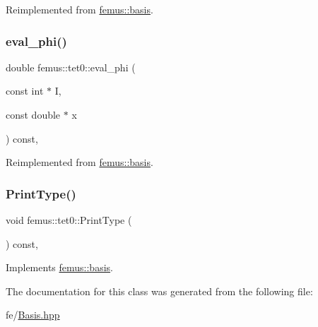 Reimplemented from \mbox{\hyperlink{classfemus_1_1basis_affd9927f6e25e264108219d862b8cb3d}{femus\+::basis}}.

\mbox{\label{classfemus_1_1tet0_a7d8d6040a264df9fe50440e9009f5ca4}} 
\subsubsection{\texorpdfstring{eval\+\_\+phi()}{eval\_phi()}}
{\footnotesize\ttfamily double femus\+::tet0\+::eval\+\_\+phi (\begin{DoxyParamCaption}\item[{const int $\ast$}]{I,  }\item[{const double $\ast$}]{x }\end{DoxyParamCaption}) const\hspace{0.3cm}{\ttfamily [inline]}, {\ttfamily [virtual]}}



Reimplemented from \mbox{\hyperlink{classfemus_1_1basis_a89b0797cdccffae5ff6d059b32016ae5}{femus\+::basis}}.

\mbox{\label{classfemus_1_1tet0_a0aa5059ca3b96f3b7f5d53d631bf736f}} 
\subsubsection{\texorpdfstring{Print\+Type()}{PrintType()}}
{\footnotesize\ttfamily void femus\+::tet0\+::\+Print\+Type (\begin{DoxyParamCaption}{ }\end{DoxyParamCaption}) const\hspace{0.3cm}{\ttfamily [inline]}, {\ttfamily [virtual]}}



Implements \mbox{\hyperlink{classfemus_1_1basis_abbae7bf8f31ec5793c911bc6d4ea0572}{femus\+::basis}}.



The documentation for this class was generated from the following file\+:\begin{DoxyCompactItemize}
\item 
fe/\mbox{\hyperlink{_basis_8hpp}{Basis.\+hpp}}\end{DoxyCompactItemize}
